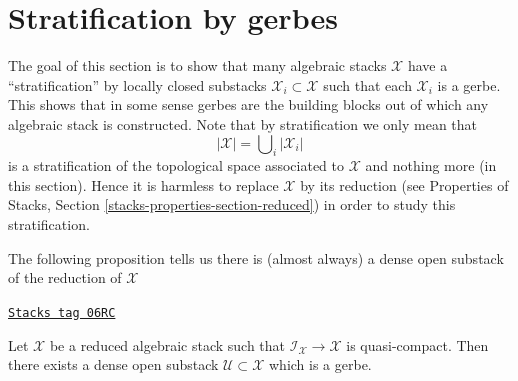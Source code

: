 \section{Stratification by gerbes}
\label{stacks-morphisms-section-stratify}
The goal of this section is to show that many algebraic stacks
$\mathcal{X}$ have a ``stratification'' by locally closed substacks
$\mathcal{X}_i \subset \mathcal{X}$ such that each $\mathcal{X}_i$ is
a gerbe. This shows that in some sense gerbes are the building blocks
out of which any algebraic stack is constructed. Note that by stratification
we only mean that
$$
|\mathcal{X}| = \bigcup\nolimits_i |\mathcal{X}_i|
$$
is a stratification of the topological space associated to $\mathcal{X}$
and nothing more (in this section). Hence it is harmless to replace
$\mathcal{X}$ by its reduction (see
Properties of Stacks, Section \ref{stacks-properties-section-reduced})
in order to study this stratification.

\medskip\noindent
The following proposition tells us there is (almost always) a dense
open substack of the reduction of $\mathcal{X}$

\begin{proposition}
\label{stacks-morphisms-proposition-open-stratum}
\href{https://stacks.math.columbia.edu/tag/06RC}{\texttt{Stacks tag 06RC}}

Let $\mathcal{X}$ be a reduced algebraic stack such that
$\mathcal{I}_\mathcal{X} \to \mathcal{X}$ is quasi-compact.
Then there exists a dense open substack $\mathcal{U} \subset \mathcal{X}$
which is a gerbe.
\end{proposition}

